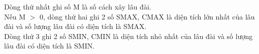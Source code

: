 Dòng thứ nhất ghi số M là số cách xây lâu đài.
\\Nếu M $>$ 0, dòng thứ hai ghi 2 số SMAX, CMAX là diện tích lớn nhất của lâu đài và số lượng lâu đài có diện tích là SMAX.
\\Dòng thứ 3 ghi 2 số SMIN, CMIN là diện tích nhỏ nhất của lâu đài và số lượng lâu đài có diện tích là SMIN.

\